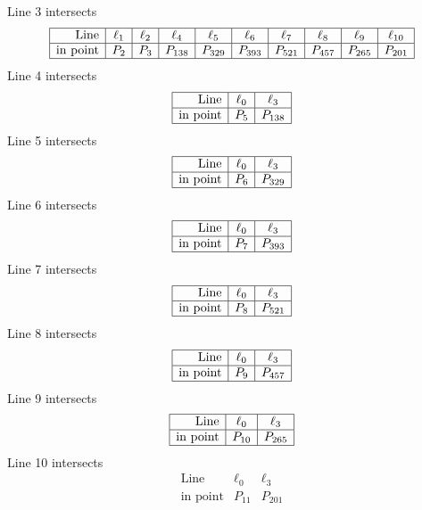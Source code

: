 \documentclass{article}
\begin{document}
{$$$$
Line 3 intersects 
$$
\begin{array}{|r*{9}{|c}|}
\hline
\mbox{Line}  & \ell_{1} & \ell_{2} & \ell_{4} & \ell_{5} & \ell_{6} & \ell_{7} & \ell_{8} & \ell_{9} & \ell_{10}\\
\hline
\mbox{in point}  & P_{2} & P_{3} & P_{138} & P_{329} & P_{393} & P_{521} & P_{457} & P_{265} & P_{201}\\
\hline
\end{array}
$$
Line 4 intersects 
$$
\begin{array}{|r*{2}{|c}|}
\hline
\mbox{Line}  & \ell_{0} & \ell_{3}\\
\hline
\mbox{in point}  & P_{5} & P_{138}\\
\hline
\end{array}
$$
Line 5 intersects 
$$
\begin{array}{|r*{2}{|c}|}
\hline
\mbox{Line}  & \ell_{0} & \ell_{3}\\
\hline
\mbox{in point}  & P_{6} & P_{329}\\
\hline
\end{array}
$$
Line 6 intersects 
$$
\begin{array}{|r*{2}{|c}|}
\hline
\mbox{Line}  & \ell_{0} & \ell_{3}\\
\hline
\mbox{in point}  & P_{7} & P_{393}\\
\hline
\end{array}
$$
Line 7 intersects 
$$
\begin{array}{|r*{2}{|c}|}
\hline
\mbox{Line}  & \ell_{0} & \ell_{3}\\
\hline
\mbox{in point}  & P_{8} & P_{521}\\
\hline
\end{array}
$$
Line 8 intersects 
$$
\begin{array}{|r*{2}{|c}|}
\hline
\mbox{Line}  & \ell_{0} & \ell_{3}\\
\hline
\mbox{in point}  & P_{9} & P_{457}\\
\hline
\end{array}
$$
Line 9 intersects 
$$
\begin{array}{|r*{2}{|c}|}
\hline
\mbox{Line}  & \ell_{0} & \ell_{3}\\
\hline
\mbox{in point}  & P_{10} & P_{265}\\
\hline
\end{array}
$$
Line 10 intersects 
$$
\begin{array}{|r*{2}{|c}|}
\hline
\mbox{Line}  & \ell_{0} & \ell_{3}\\
\hline
\mbox{in point}  & P_{11} & P_{201}\\

\end{array}$$}
\end{document}
